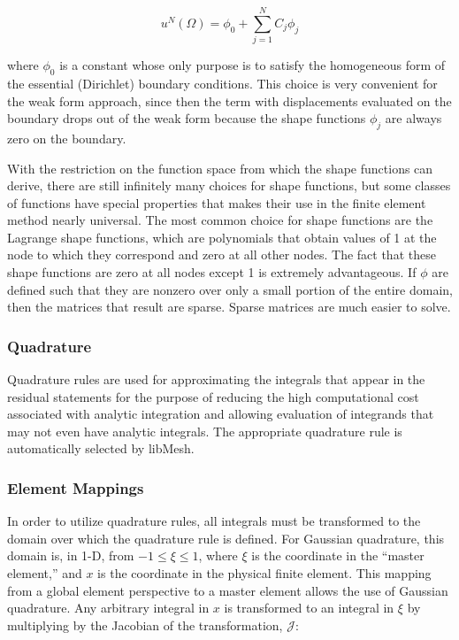 \documentclass[10pt]{article}
\numberwithin{equation}{section} %
\begin{document}
\begin{equation}
u^N(\Omega)=\phi_0+\sum_{j=1}^{N}C_j\phi_j
\end{equation}

where \(\phi_0\) is a constant whose only purpose is to satisfy the homogeneous form of the essential (Dirichlet) boundary conditions. This choice is very convenient for the weak form approach, since then the term with displacements evaluated on the boundary drops out of the weak form because the shape functions \(\phi_j\) are always zero on the boundary. 

With the restriction on the function space from which the shape functions can derive, there are still infinitely many choices for shape functions, but some classes of functions have special properties that makes their use in the finite element method nearly universal. The most common choice for shape functions are the Lagrange shape functions, which are polynomials that obtain values of 1 at the node to which they correspond and zero at all other nodes. The fact that these shape functions are zero at all nodes except 1 is extremely advantageous. If \(\phi\) are defined such that they are nonzero over only a small portion of the entire domain, then the matrices that result are sparse. Sparse matrices are much easier to solve. 

\subsubsection{Quadrature}
\label{sec:Quadrature}

Quadrature rules are used for approximating the integrals that appear in the residual statements for the purpose of reducing the high computational cost associated with analytic integration and allowing evaluation of integrands that may not even have analytic integrals. The appropriate quadrature rule is automatically selected by libMesh.

\subsubsection{Element Mappings}

In order to utilize quadrature rules, all integrals must be transformed to the domain over which the quadrature rule is defined. For Gaussian quadrature, this domain is, in 1-D, from \(-1\leq\xi\leq1\), where \(\xi\) is the coordinate in the ``master element,'' and \(x\) is the coordinate in the physical finite element. This mapping from a global element perspective to a master element allows the use of Gaussian quadrature. Any arbitrary integral in \(x\) is transformed to an integral in \(\xi\) by multiplying by the Jacobian of the transformation, \(\mathscr{J}\):
\end{document}
